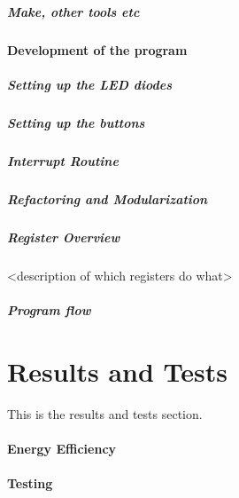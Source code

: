 \documentclass{article}
\begin{document}
\subsubsection{Make, other tools etc}

\subsection{Development of the program}

\subsubsection{Setting up the LED diodes}

\subsubsection{Setting up the buttons}

\subsubsection{Interrupt Routine}

\subsubsection{Refactoring and Modularization}

\subsubsection{Register Overview}

<description of which registers do what>

\subsubsection{Program flow}



\part{Results and Tests}

This is the results and tests section.

\subsection{Energy Efficiency}

\subsection{Testing}
\end{document}
